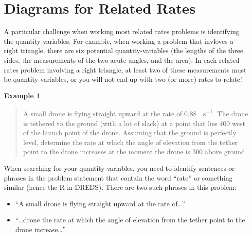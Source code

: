 \documentclass[12pt,]{book}
\newcommand{\acronym}[1]{#1}
\theoremstyle{plain}
\theoremstyle{definition}
\newtheorem{example}[theorem]{Example}
\numberwithin{equation}{section}
\begin{document}
\section[Diagrams for  Related Rates]{Diagrams for  Related Rates}\label{section-diagrams-for-related-rates}
A particular challenge when working most related rates problems is identifying the quantity-variables. For example, when working a problem that invloves a right triangle, there are six potential quantity-variables (the lengths of the three sides, the measurements of the two acute angles, and the area). In each related rates problem involving a right triangle, at least two of these measurements must be quantity-variables, or you will not end up with two (or more) rates to relate!%
\begin{example}\label{example-20}

            \begin{quote}A small drone is flying straight upward at the rate of \SI{0.88}{\foot\per\second}. The drone is tethered to the ground (with a lot of slack) at a point that lies \SI{400}{\foot} west of the launch point of the drone. Assuming that the ground is perfectly level, determine the rate at which the angle of elevation from the tether point to the drone increases at the moment the drone is \SI{300}{\foot} above ground.\end{quote}
\par
When searching for your quantity-variables, you need to identify sentences or phrases in the problem statement that contain the word ``rate'' or something similar (hence the \acronym{R} in \acronym{DREDS}). There are two such phrases in this problem:
        \begin{itemize}[label=\textbullet]
\item{}``A small drone is flying straight upward at the rate of\dots{}''\item{}``\dots{}drone the rate at which the angle of elevation from the tether point to the drone increase\dots{}''\end{itemize}


\end{example}
\end{document}
